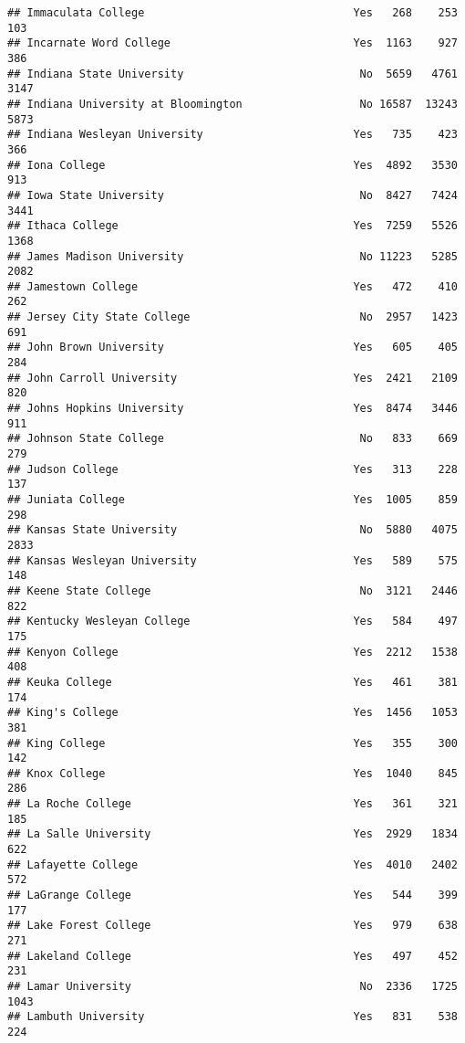 \documentclass[
]{article}
\begin{document}
\begin{verbatim}
## Immaculata College                                Yes   268    253    103
## Incarnate Word College                            Yes  1163    927    386
## Indiana State University                           No  5659   4761   3147
## Indiana University at Bloomington                  No 16587  13243   5873
## Indiana Wesleyan University                       Yes   735    423    366
## Iona College                                      Yes  4892   3530    913
## Iowa State University                              No  8427   7424   3441
## Ithaca College                                    Yes  7259   5526   1368
## James Madison University                           No 11223   5285   2082
## Jamestown College                                 Yes   472    410    262
## Jersey City State College                          No  2957   1423    691
## John Brown University                             Yes   605    405    284
## John Carroll University                           Yes  2421   2109    820
## Johns Hopkins University                          Yes  8474   3446    911
## Johnson State College                              No   833    669    279
## Judson College                                    Yes   313    228    137
## Juniata College                                   Yes  1005    859    298
## Kansas State University                            No  5880   4075   2833
## Kansas Wesleyan University                        Yes   589    575    148
## Keene State College                                No  3121   2446    822
## Kentucky Wesleyan College                         Yes   584    497    175
## Kenyon College                                    Yes  2212   1538    408
## Keuka College                                     Yes   461    381    174
## King's College                                    Yes  1456   1053    381
## King College                                      Yes   355    300    142
## Knox College                                      Yes  1040    845    286
## La Roche College                                  Yes   361    321    185
## La Salle University                               Yes  2929   1834    622
## Lafayette College                                 Yes  4010   2402    572
## LaGrange College                                  Yes   544    399    177
## Lake Forest College                               Yes   979    638    271
## Lakeland College                                  Yes   497    452    231
## Lamar University                                   No  2336   1725   1043
## Lambuth University                                Yes   831    538    224

\end{verbatim}
\end{document}
